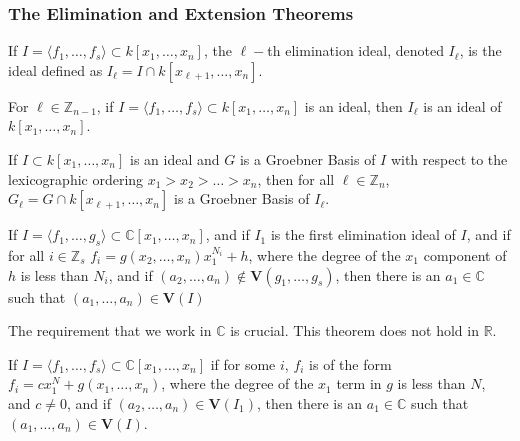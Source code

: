 \documentclass[crop=false,class=book]{standalone}
\begin{document}
\subsubsection{The Elimination and Extension Theorems}
\begin{definition}
If $I = \langle f_1,\hdots, f_s\rangle \subset k[x_1,\hdots ,x_n]$, the $\ell-$th elimination ideal, denoted $I_{\ell}$, is the ideal defined as $I_{\ell} = I \cap k[x_{\ell+1},\hdots, x_n]$.
\end{definition}
\begin{theorem}
For $\ell \in \mathbb{Z}_{n-1}$, if $I = \langle f_1,\hdots, f_s\rangle\subset k[x_1,\hdots ,x_n]$ is an ideal, then $I_{\ell}$ is an ideal of $k[x_1,\hdots ,x_n]$.
\end{theorem}
\begin{theorem}
If $I\subset k[x_1,\hdots ,x_n]$ is an ideal and $G$ is a Groebner Basis of $I$ with respect to the lexicographic ordering $x_1>x_2>\hdots > x_n$, then for all $\ell \in \mathbb{Z}_{n}$, $G_{\ell} = G\cap k[x_{\ell+1},\hdots, x_n]$ is a Groebner Basis of $I_{\ell}$.
\end{theorem}
\begin{theorem}
If $I = \langle f_1,\hdots, g_s\rangle \subset \mathbb{C}[x_1,\hdots ,x_n]$, and if $I_1$ is the first elimination ideal of $I$, and if for all $i\in \mathbb{Z}_s$ $f_i = g(x_2,\hdots, x_n)x_1^{N_i}+h$, where the degree of the $x_1$ component of $h$ is less than $N_i$, and if $(a_2,\hdots, a_n)\notin \textbf{V}(g_1,\hdots, g_s)$, then there is an $a_1 \in \mathbb{C}$ such that $(a_1,\hdots, a_n)\in \textbf{V}(I)$
\end{theorem}
\begin{remark}
The requirement that we work in $\mathbb{C}$ is crucial. This theorem does not hold in $\mathbb{R}$. 
\end{remark}
\begin{theorem}
If $I = \langle f_1,\hdots, f_s\rangle \subset \mathbb{C}[x_1,\hdots, x_n]$ if for some $i$, $f_i$ is of the form $f_i = cx_1^N + g(x_1,\hdots, x_n)$, where the degree of the $x_1$ term in $g$ is less than $N$, and $c \ne 0$, and if $(a_2,\hdots, a_n) \in \textbf{V}(I_{1})$, then there is an $a_1 \in \mathbb{C}$ such that $(a_1,\hdots, a_n) \in \textbf{V}(I)$.
\end{theorem}
\end{document}
